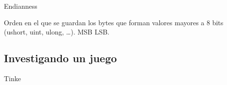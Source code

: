 \begin{frame}{Endianness}
    \begin{block}{}
        Orden en el que se guardan los bytes que forman valores mayores a 8 bits (ushort, uint, ulong, \ldots). MSB \textrightarrow LSB.
    \end{block}
    \centering{}
    \vfill
\end{frame}

\subsection{Investigando un juego}
\begin{frame}{Tinke}
\end{frame}

